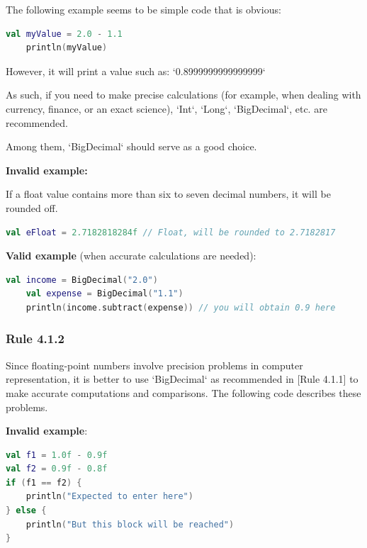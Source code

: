 {{{{The following example seems to be simple code that is obvious: 

\begin{lstlisting}[language=Kotlin]
    val myValue = 2.0 - 1.1
    println(myValue)
\end{lstlisting}


However, it will print a value such as: `0.8999999999999999`



As such, if you need to make precise calculations (for example, when dealing with currency, finance, or an exact science), `Int`, `Long`, `BigDecimal`, etc. are recommended.

Among them, `BigDecimal` should serve as a good choice.



\textbf{Invalid example:} \

If a float value contains more than six to seven decimal numbers, it will be rounded off.

\begin{lstlisting}[language=Kotlin]
 val eFloat = 2.7182818284f // Float, will be rounded to 2.7182817
\end{lstlisting}


\textbf{Valid example} (when accurate calculations are needed): 

\begin{lstlisting}[language=Kotlin]
    val income = BigDecimal("2.0")
    val expense = BigDecimal("1.1")
    println(income.subtract(expense)) // you will obtain 0.9 here
\end{lstlisting}


\subsubsection*{\textbf{Rule 4.1.2}}
\leavevmode\newline



Since floating-point numbers involve precision problems in computer representation, it is better to use `BigDecimal` as recommended in [Rule 4.1.1] to make accurate computations and comparisons. The following code describes these problems.



\textbf{Invalid example}:

\begin{lstlisting}[language=Kotlin]
val f1 = 1.0f - 0.9f
val f2 = 0.9f - 0.8f
if (f1 == f2) {
    println("Expected to enter here")
} else {
    println("But this block will be reached")
}


\end{lstlisting}}}}}
